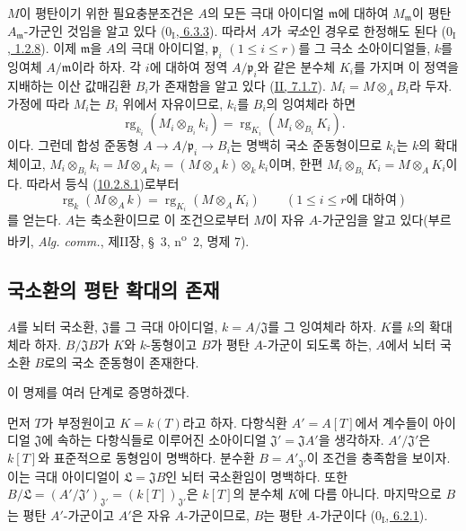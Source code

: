$M$이 평탄이기 위한 필요충분조건은 $A$의 모든 극대 아이디얼
$\mathfrak m$에 대하여 $M_{\mathfrak m}$이 평탄
$A_{\mathfrak m}$-가군인 것임을 알고 있다
(\hyperref[0.6.3.3-ko]{$0_{\mathrm I}$, 6.3.3}). 따라서 $A$가
\emph{국소}인 경우로 한정해도 된다
(\hyperref[0.1.2.8-ko]{$0_{\mathrm I}$, 1.2.8}). 이제
$\mathfrak m$을 $A$의 극대 아이디얼, $\mathfrak p_i$
$(1\leq i\leq r)$를 그 극소 소아이디얼들, $k$를 잉여체
$A/\mathfrak m$이라 하자. 각 $i$에 대하여 정역
$A/\mathfrak p_i$와 같은 분수체 $K_i$를 가지며 이 정역을 지배하는
이산 값매김환 $B_i$가 존재함을 알고 있다
(\hyperref[II.7.1.7-ko]{II, 7.1.7}). $M_i=M\otimes_A B_i$라 두자.
가정에 따라 $M_i$는 $B_i$ 위에서 자유이므로, $k_i$를 $B_i$의
잉여체라 하면
\[
\label{0.10.2.8.1-fr}
  \operatorname{rg}_{k_i}(M_i\otimes_{B_i}k_i)
  =\operatorname{rg}_{K_i}(M_i\otimes_{B_i}K_i).
  \tag{10.2.8.1}
\]
이다. 그런데 합성 준동형 $A\to A/\mathfrak p_i\to B_i$는 명백히
국소 준동형이므로 $k_i$는 $k$의 확대체이고,
$M_i\otimes_{B_i}k_i=M\otimes_A k_i=(M\otimes_A k)\otimes_k k_i$이며,
한편 $M_i\otimes_{B_i}K_i=M\otimes_A K_i$이다. 따라서 등식
(\hyperref[0.10.2.8.1-fr]{10.2.8.1})로부터
\[
  \operatorname{rg}_k(M\otimes_A k)=\operatorname{rg}_{K_i}(M\otimes_A K_i)
  \qquad(1\leq i\leq r\text{에 대하여})
\]
를 얻는다. $A$는 축소환이므로 이 조건으로부터 $M$이 자유
$A$-가군임을 알고 있다(부르바키, \emph{Alg. comm.}, 제II장,
\S~3, n\textsuperscript{o}~2, 명제 7).

\subsection{국소환의 평탄 확대의 존재}
\label{subsection:0.10.3-fr}

\begin{proposition}[10.3.1]
\label{0.10.3.1-fr}
$A$를 뇌터 국소환, $\mathfrak J$를 그 극대 아이디얼,
$k=A/\mathfrak J$를 그 잉여체라 하자. $K$를 $k$의 확대체라 하자.
$B/\mathfrak J B$가 $K$와 $k$-동형이고 $B$가 평탄 $A$-가군이 되도록
하는, $A$에서 뇌터 국소환 $B$로의 국소 준동형이 존재한다.
\end{proposition}

이 명제를 여러 단계로 증명하겠다.

\begin{env}[10.3.1.1]
\label{0.10.3.1.1-fr}
먼저 $T$가 부정원이고 $K=k(T)$라고 하자. 다항식환 $A'=A[T]$에서
계수들이 아이디얼 $\mathfrak J$에 속하는 다항식들로 이루어진
소아이디얼 $\mathfrak J'=\mathfrak J A'$을 생각하자.
$A'/\mathfrak J'$은 $k[T]$와 표준적으로 동형임이 명백하다. 분수환
$B=A'_{\mathfrak J'}$이 조건을 충족함을 보이자. 이는 극대 아이디얼이
$\mathfrak L=\mathfrak J B$인 뇌터 국소환임이 명백하다. 또한
$B/\mathfrak L=(A'/\mathfrak J')_{\mathfrak J'}=(k[T])_{\mathfrak J'}$은
$k[T]$의 분수체 $K$에 다름 아니다. 마지막으로 $B$는 평탄
$A'$-가군이고 $A'$은 자유 $A$-가군이므로, $B$는 평탄 $A$-가군이다
(\hyperref[0.6.2.1-ko]{$0_{\mathrm I}$, 6.2.1}).
\end{env}

